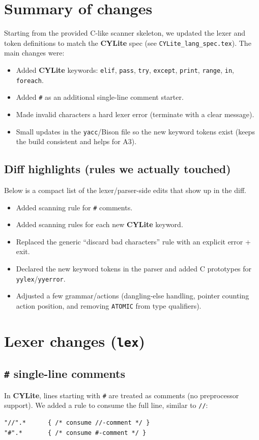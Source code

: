\documentclass[11pt]{article}
\newcommand{\lang}{\textbf{CYLite}}
\begin{document}
\section{Summary of changes}
Starting from the provided C-like scanner skeleton, we updated the lexer and token definitions to match the \lang{} spec (see \texttt{CYLite\_lang\_spec.tex}).
The main changes were:
\begin{itemize}
	\item Added \lang{} keywords: \texttt{elif}, \texttt{pass}, \texttt{try}, \texttt{except}, \texttt{print}, \texttt{range}, \texttt{in}, \texttt{foreach}.
	\item Added \texttt{\#} as an additional single-line comment starter.
	\item Made invalid characters a hard lexer error (terminate with a clear message).
	\item Small updates in the \texttt{yacc}/Bison file so the new keyword tokens exist (keeps the build consistent and helps for A3).
\end{itemize}

\subsection*{Diff highlights (rules we actually touched)}
Below is a compact list of the lexer/parser-side edits that show up in the diff.
\begin{itemize}
	\item Added scanning rule for \texttt{\#} comments.
	\item Added scanning rules for each new \lang{} keyword.
	\item Replaced the generic ``discard bad characters'' rule with an explicit error + exit.
	\item Declared the new keyword tokens in the parser and added C prototypes for \texttt{yylex}/\texttt{yyerror}.
	\item Adjusted a few grammar/actions (dangling-else handling, pointer counting action position, and removing \texttt{ATOMIC} from type qualifiers).
\end{itemize}

\section{Lexer changes (\texttt{lex})}
\subsection{\texttt{\#} single-line comments}
In \lang{}, lines starting with \texttt{\#} are treated as comments (no preprocessor support).
We added a rule to consume the full line, similar to \texttt{//}:
\begin{lstlisting}
"//".*      { /* consume //-comment */ }
"#".*       { /* consume #-comment */ }
\end{lstlisting}
\end{document}

